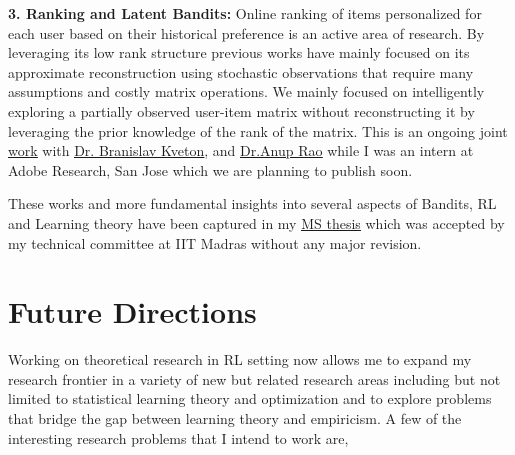 \documentclass{article}
\begin{document}

\textbf{3. Ranking and Latent Bandits:} Online ranking of items personalized for each user based on their historical preference is an active area of research. By leveraging its low rank structure previous works have mainly focused on its approximate reconstruction using stochastic observations that require many assumptions and costly matrix operations. We mainly focused on intelligently exploring a partially observed user-item matrix without reconstructing it by leveraging the prior knowledge of the rank of the matrix. This is an ongoing joint \href{https://subhojyoti.github.io/pdf/paper.pdf}{\underline{\color{blue} work}} with \href{http://www.bkveton.com/}{\underline{\color{red}Dr. Branislav Kveton}}, and \href{https://sites.google.com/site/anupraob/}{\underline{\color{red}Dr.Anup Rao}}  while I was an intern at Adobe Research, San Jose which we are planning to publish soon.

These works and more fundamental insights into several aspects of Bandits, RL and Learning theory have been captured in my \href{https://www.cse.iitm.ac.in/~ravi/papers/Subhojyoti_thesis.pdf}{\underline{\color{blue}MS thesis}} which was accepted by my technical committee at IIT Madras without any major revision.
	 
	
\vspace*{-2em}
\section{Future Directions}
\vspace*{-1em}


Working on theoretical research in RL setting now allows me to expand my research frontier in a variety of new but related research areas including but not limited to statistical learning theory and optimization and to explore problems that bridge the gap between learning theory and empiricism. A few of the interesting research problems
that I intend to work are,
\end{document}
